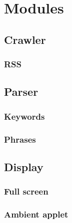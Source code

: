 \section{Modules}


\subsection{Crawler}

\subsubsection{RSS}


\subsection{Parser}

\subsubsection{Keywords}

\subsubsection{Phrases}


\subsection{Display}

\subsubsection{Full screen}

\subsubsection{Ambient applet}

